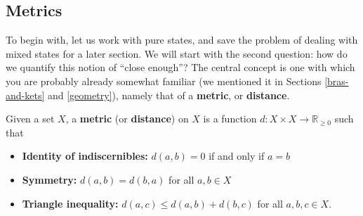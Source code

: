 \documentclass[fleqn,a4paper]{article}
\providecommand{\tightlist}{\setlength{\itemsep}{0pt}\setlength{\parskip}{0pt}}
\newenvironment{idea}{\everypar{\setlength{\parindent}{1.5em}}}{}
\theoremstyle{definition}
\theoremstyle{definition}
\theoremstyle{definition}
\theoremstyle{definition}
\theoremstyle{remark}
\begin{document}
\hypertarget{metrics}{%
\subsection{Metrics}\label{metrics}}

To begin with, let us work with pure states, and save the problem of dealing with mixed states for a later section.
We will start with the second question: how do we quantify this notion of ``close enough''?
The central concept is one with which you are probably already somewhat familiar (we mentioned it in Sections \ref{bras-and-kets} and \ref{geometry}), namely that of a \textbf{metric}, or \textbf{distance}.

\begin{idea}

Given a set \(X\), a \textbf{metric} (or \textbf{distance}) on \(X\) is a function \(d\colon X\times X\to\mathbb{R}_{\geqslant 0}\) such that

\begin{itemize}
\tightlist
\item
  \textbf{Identity of indiscernibles:} \(d(a,b)=0\) if and only if \(a=b\)
\item
  \textbf{Symmetry:} \(d(a,b)=d(b,a)\) for all \(a,b\in X\)
\item
  \textbf{Triangle inequality:} \(d(a,c)\leqslant d(a,b)+d(b,c)\) for all \(a,b,c\in X\).
\end{itemize}

\end{idea}
\end{document}
